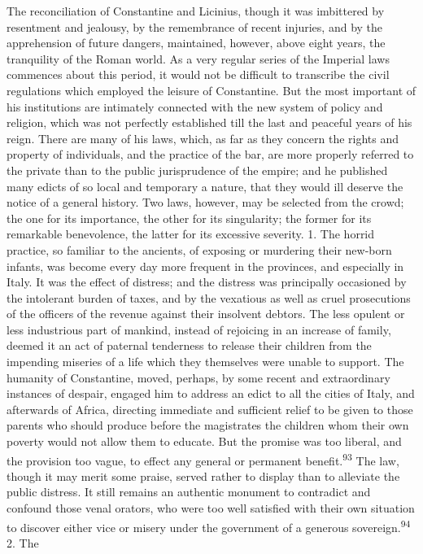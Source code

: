 The reconciliation of Constantine and Licinius, though it was
imbittered by resentment and jealousy, by the remembrance of
recent injuries, and by the apprehension of future dangers,
maintained, however, above eight years, the tranquility of the
Roman world. As a very regular series of the Imperial laws
commences about this period, it would not be difficult to
transcribe the civil regulations which employed the leisure of
Constantine. But the most important of his institutions are
intimately connected with the new system of policy and religion,
which was not perfectly established till the last and peaceful
years of his reign. There are many of his laws, which, as far as
they concern the rights and property of individuals, and the
practice of the bar, are more properly referred to the private
than to the public jurisprudence of the empire; and he published
many edicts of so local and temporary a nature, that they would
ill deserve the notice of a general history. Two laws, however,
may be selected from the crowd; the one for its importance, the
other for its singularity; the former for its remarkable
benevolence, the latter for its excessive severity. 1. The horrid
practice, so familiar to the ancients, of exposing or murdering
their new-born infants, was become every day more frequent in the
provinces, and especially in Italy. It was the effect of
distress; and the distress was principally occasioned by the
intolerant burden of taxes, and by the vexatious as well as cruel
prosecutions of the officers of the revenue against their
insolvent debtors. The less opulent or less industrious part of
mankind, instead of rejoicing in an increase of family, deemed it
an act of paternal tenderness to release their children from the
impending miseries of a life which they themselves were unable to
support. The humanity of Constantine, moved, perhaps, by some
recent and extraordinary instances of despair, engaged him to
address an edict to all the cities of Italy, and afterwards of
Africa, directing immediate and sufficient relief to be given to
those parents who should produce before the magistrates the
children whom their own poverty would not allow them to educate.
But the promise was too liberal, and the provision too vague, to
effect any general or permanent benefit.\textsuperscript{93} The law, though it
may merit some praise, served rather to display than to alleviate
the public distress. It still remains an authentic monument to
contradict and confound those venal orators, who were too well
satisfied with their own situation to discover either vice or
misery under the government of a generous sovereign.\textsuperscript{94} 2. The
